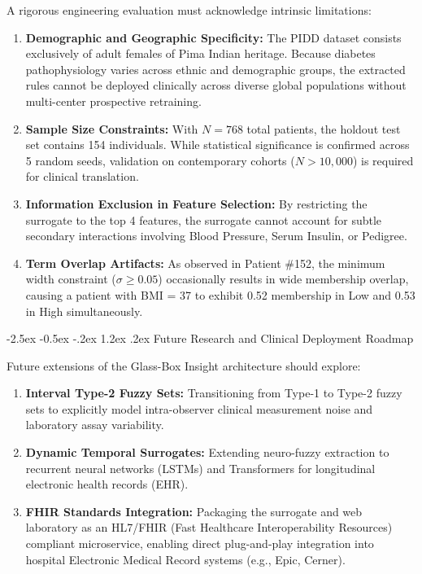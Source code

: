\documentclass[12pt,a4paper,oneside]{report}
\makeatletter
\renewcommand\section{\@startsection {section}{1}{\z@}%
                                   {-2.5ex \@plus -0.5ex \@minus -.2ex}%
                                   {1.2ex \@plus .2ex}%
                                   {\normalfont\fontsize{13}{16}\selectfont\bfseries}}
\makeatother
\begin{document}
A rigorous engineering evaluation must acknowledge intrinsic limitations:
\begin{enumerate}
    \setlength{\itemsep}{1pt}
    \setlength{\parskip}{0pt}
    \item \textbf{Demographic and Geographic Specificity:} The PIDD dataset consists exclusively of adult females of Pima Indian heritage. Because diabetes pathophysiology varies across ethnic and demographic groups, the extracted rules cannot be deployed clinically across diverse global populations without multi-center prospective retraining.
    \item \textbf{Sample Size Constraints:} With $N = 768$ total patients, the holdout test set contains 154 individuals. While statistical significance is confirmed across 5 random seeds, validation on contemporary cohorts ($N > 10{,}000$) is required for clinical translation.
    \item \textbf{Information Exclusion in Feature Selection:} By restricting the surrogate to the top 4 features, the surrogate cannot account for subtle secondary interactions involving Blood Pressure, Serum Insulin, or Pedigree.
    \item \textbf{Term Overlap Artifacts:} As observed in Patient \#152, the minimum width constraint ($\sigma \ge 0.05$) occasionally results in wide membership overlap, causing a patient with BMI = 37 to exhibit 0.52 membership in Low and 0.53 in High simultaneously.
\end{enumerate}

\section{Future Research and Clinical Deployment Roadmap}

Future extensions of the Glass-Box Insight architecture should explore:
\begin{enumerate}
    \setlength{\itemsep}{1pt}
    \setlength{\parskip}{0pt}
    \item \textbf{Interval Type-2 Fuzzy Sets:} Transitioning from Type-1 to Type-2 fuzzy sets to explicitly model intra-observer clinical measurement noise and laboratory assay variability.
    \item \textbf{Dynamic Temporal Surrogates:} Extending neuro-fuzzy extraction to recurrent neural networks (LSTMs) and Transformers for longitudinal electronic health records (EHR).
    \item \textbf{FHIR Standards Integration:} Packaging the surrogate and web laboratory as an HL7/FHIR (Fast Healthcare Interoperability Resources) compliant microservice, enabling direct plug-and-play integration into hospital Electronic Medical Record systems (e.g., Epic, Cerner).
\end{enumerate}
\end{document}
